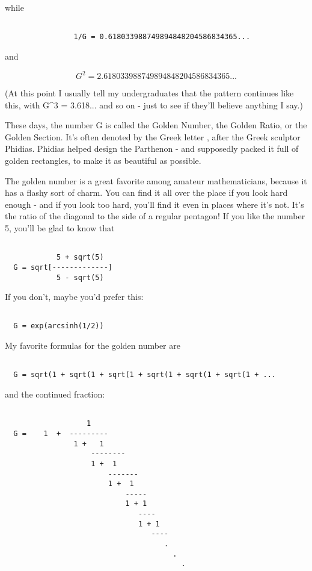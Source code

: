 while 


\begin{verbatim}

                1/G = 0.618033988749894848204586834365...
\end{verbatim}
    
and


$$

                G^{2  } = 2.618033988749894848204586834365...
$$
    
(At this point I usually tell my undergraduates that the pattern
continues like this, with G^{3} = 3.618... and so on - just to see if
they'll believe anything I say.)
 
These days, the number G is called the Golden Number, the Golden Ratio,  
or the Golden Section.  It's often denoted by the Greek letter \Phi , 
after the Greek sculptor Phidias.  Phidias helped design the Parthenon - 
and supposedly packed it full of golden rectangles, to make it as 
beautiful as possible.  

The golden number is a great favorite among amateur mathematicians, because 
it has a flashy sort of charm.  You can find it all over the place if you
look hard enough - and if you look too hard, you'll find it even in places
where it's not.   It's the ratio of the diagonal to the side of a regular 
pentagon!  If you like the number 5, you'll be glad to know that


\begin{verbatim}

            5 + sqrt(5)
  G = sqrt[-------------]
            5 - sqrt(5)
\end{verbatim}
    
If you don't, maybe you'd prefer this:


\begin{verbatim}

  G = exp(arcsinh(1/2))
\end{verbatim}
    
My favorite formulas for the golden number are


\begin{verbatim}

  G = sqrt(1 + sqrt(1 + sqrt(1 + sqrt(1 + sqrt(1 + sqrt(1 + ...
\end{verbatim}
    
and the continued fraction:


\begin{verbatim}

                   1
  G =    1  +  ---------
                1 +   1
                    -------- 
                    1 +  1
                        -------
                        1 +  1
                            -----
                            1 + 1
                               ----  
                               1 + 1
                                  ----
                                     .
                                       .
                                         .

\end{verbatim}
    
